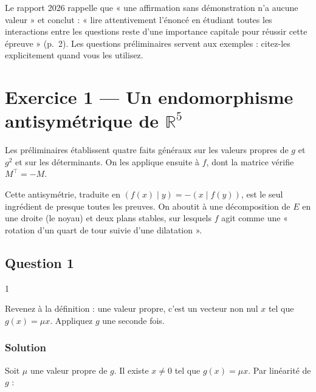 \documentclass[11pt,a4paper]{article}
\begin{document}
\begin{jury}

Le rapport 2026 rappelle que « une affirmation sans démonstration n'a aucune valeur » et conclut : « lire attentivement l'énoncé en étudiant toutes les interactions entre les questions reste d'une importance capitale pour réussir cette épreuve » (p.~2). Les questions préliminaires servent aux exemples : citez-les explicitement quand vous les utilisez.

\end{jury}

\hypertarget{exercice-1-un-endomorphisme-antisymuxe9trique-de-mathbb-r5}{%
\section{\texorpdfstring{Exercice 1 --- Un endomorphisme antisymétrique de \(\mathbb R^5\)}{Exercice 1 --- Un endomorphisme antisymétrique de \textbackslash mathbb R\^{}5}}\label{exercice-1-un-endomorphisme-antisymuxe9trique-de-mathbb-r5}}

Les préliminaires établissent quatre faits généraux sur les valeurs propres de \(g\) et \(g^2\) et sur les déterminants. On les applique ensuite à \(f\), dont la matrice vérifie \(M^\top=-M\).

Cette antisymétrie, traduite en \((f(x)\mid y)=-(x\mid f(y))\), est le seul ingrédient de presque toutes les preuves. On aboutit à une décomposition de \(E\) en une droite (le noyau) et deux plans stables, sur lesquels \(f\) agit comme une « rotation d'un quart de tour suivie d'une dilatation ».

\hypertarget{question-1}{%
\subsection{Question 1}\label{question-1}}

\begin{indication}{1}

Revenez à la définition : une valeur propre, c'est un vecteur non nul \(x\) tel que \(g(x)=\mu x\). Appliquez \(g\) une seconde fois.

\end{indication}

\hypertarget{solution}{%
\subsubsection{Solution}\label{solution}}

Soit \(\mu\) une valeur propre de \(g\). Il existe \(x\neq0\) tel que \(g(x)=\mu x\). Par linéarité de \(g\) :
\end{document}
